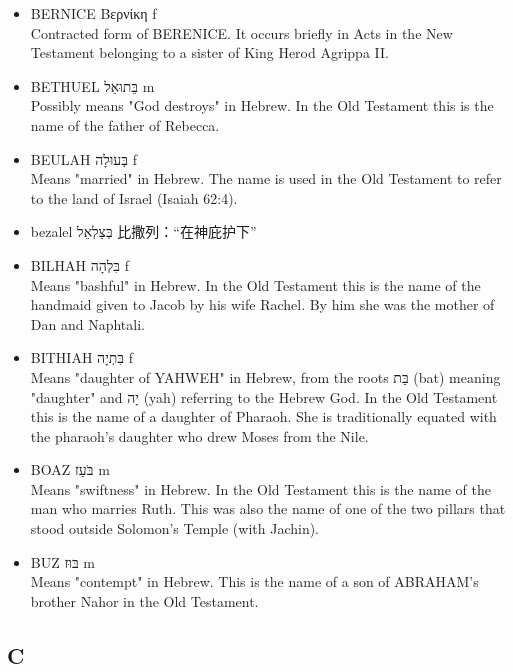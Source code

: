 \begin{itemize}
\item {BERNICE Βερνίκη f}\\
Contracted form of BERENICE. It occurs briefly in Acts in the New Testament belonging to a sister of King Herod Agrippa II.
\item {BETHUEL בֵּתוּאֵל m}\\
Possibly means "God destroys" in Hebrew. In the Old Testament this is the name of the father of Rebecca.
\item {BEULAH בְּעוּלָה f}\\
Means "married" in Hebrew. The name is used in the Old Testament to refer to the land of Israel (Isaiah 62:4).
\item bezalel בְּצַלְאֵל 比撒列：“在神庇护下”
\item {BILHAH בִּלְהָה f}\\
Means "bashful" in Hebrew. In the Old Testament this is the name of the handmaid given to Jacob by his wife Rachel. By him she was the mother of Dan and Naphtali.

\item {BITHIAH בִּתְיָה f}\\
Means "daughter of YAHWEH" in Hebrew, from the roots בַּת (bat) meaning "daughter" and יָה (yah) referring to the Hebrew God. In the Old Testament this is the name of a daughter of Pharaoh. She is traditionally equated with the pharaoh's daughter who drew Moses from the Nile.

\item {BOAZ בֹּעַז m}\\
Means "swiftness" in Hebrew. In the Old Testament this is the name of the man who marries Ruth. This was also the name of one of the two pillars that stood outside Solomon's Temple (with Jachin).

\item {BUZ בּוּז m}\\
Means "contempt" in Hebrew. This is the name of a son of ABRAHAM's brother Nahor in the Old Testament.
\end{itemize}


\subsection{C}

